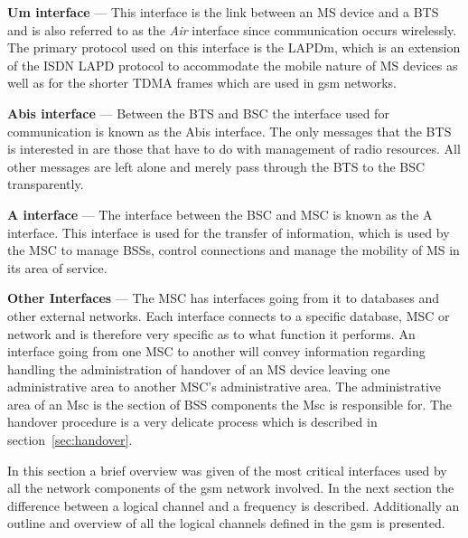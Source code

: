 \begin{description}
  \item{\textbf{Um interface}} --- This interface is the link between an \gls{MS} device and a \gls{BTS} and is also referred to as the \emph{Air} interface since communication occurs wirelessly. The primary protocol used on this interface is the \gls{LAPDm}, which is an extension of the \gls{ISDN} LAPD protocol to accommodate the mobile nature of \gls{MS} devices as well as for the shorter \gls{TDMA} frames which are used in \gls{gsm} networks\cite{wirelesstelcoMullet,GSMSecurInTeleNetwork}.
\item{\textbf{Abis interface}} --- Between the \gls{BTS} and \gls{BSC} the interface used for communication is known as the Abis interface. The only messages that the \gls{BTS} is interested in are those that have to do with management of radio resources\cite{wirelesstelcoMullet,GSMSecurInTeleNetwork}. All other messages are left alone and merely pass through the \gls{BTS} to the \gls{BSC} transparently.
\item{\textbf{A interface}} --- The interface between the \gls{BSC} and \gls{MSC} is known as the A interface. This interface is used for the transfer of information, which is used by the \gls{MSC} to manage BSSs, control connections and manage the mobility of \gls{MS} in its area of service\cite{wirelesstelcoMullet,GSMArchitectureProtocolsServices}.
\item{\textbf{Other Interfaces}} --- The \gls{MSC} has interfaces going from it to databases and other external networks. Each interface connects to a specific database, \gls{MSC} or network and is therefore very specific as to what function it performs\cite{wirelesstelcoMullet,GSMArchitectureProtocolsServices}. An interface going from one \gls{MSC} to another will convey information regarding handling the administration of handover of an \gls{MS} device leaving one administrative area to another MSC's administrative area. The administrative area of an Msc is the section of \gls{BSS} components the Msc is responsible for. The handover procedure is a very delicate process which is described in section~\ref{sec:handover}.
\end{description}

In this section a brief overview was given of the most critical interfaces used by all the network components of the \gls{gsm} network involved. In the next section the difference between a logical channel and a frequency is described. Additionally an outline and overview of all the logical channels defined in the \gls{gsm} is presented. 
